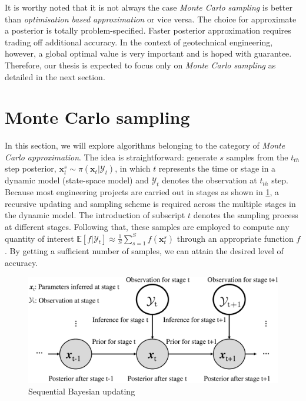 It is worthy noted that it is not always the case \textit{Monte Carlo sampling} is better than \textit{optimisation based approximation} or vice versa. The choice for approximate a posterior is totally problem-specified. Faster posterior approximation requires trading off additional accuracy. In the context of geotechnical engineering, however, a global optimal value is very important and is hoped with guarantee. Therefore, our thesis is expected to focus only on \textit{Monte Carlo sampling} as detailed in the next section.

\section{Monte Carlo sampling}
In this section, we will explore algorithms belonging to the category of \textit{Monte Carlo approximation}. The idea is straightforward: generate $s$ samples from the $t_{th}$ step posterior, $\boldsymbol{x}_{t}^{s} \sim  \pi(\boldsymbol{x}_{t}|\mathcal{Y}_{t})$, in which $t$ represents the time or stage in a dynamic model (state-space model) and $\mathcal{Y}_{t}$ denotes the observation at $t_{th}$ step. Because most engineering projects are carried out in stages as shown in \cref{fig: Sequential Bayesian}, a recursive updating and sampling scheme is required across the multiple stages in the dynamic model. The introduction of subscript $t$ denotes the sampling process at different stages. Following that, these samples are employed to compute any quantity of interest $\mathbb{E}[ f|\mathcal{Y}_{t}] \approx \frac{1}{S} \sum_{s=1}^{S}f(\boldsymbol{x}_{t}^{s})$ through an appropriate function $f$. By getting a sufficient number of samples, we can attain the desired level of accuracy.
\begin{figure}[htbp]
    \centering
    \includegraphics[width = 140mm]{Figures/figures-Sequential_Bayesian.pdf}
    \caption{Sequential Bayesian updating}
    \label{fig: Sequential Bayesian}
\end{figure}
